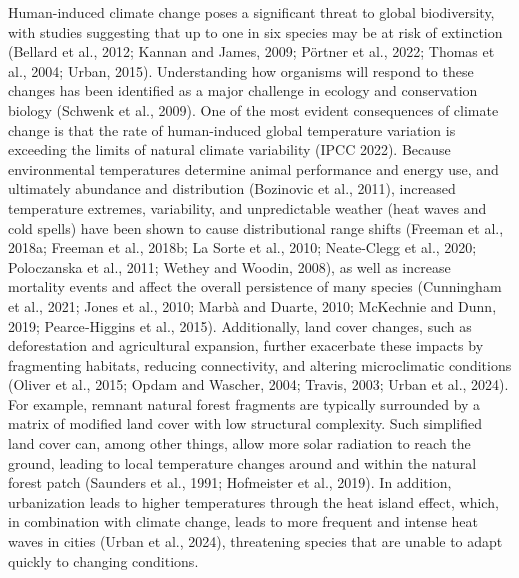 \documentclass[10pt, twoside]{book} %
\begin{document}
	Human-induced climate change poses a significant threat to global biodiversity, with studies suggesting that up to one in six species may be at risk of extinction (Bellard et al., 2012; Kannan and James, 2009; Pörtner et al., 2022; Thomas et al., 2004; Urban, 2015). Understanding how organisms will respond to these changes has been identified as a major challenge in ecology and conservation biology (Schwenk et al., 2009). One of the most evident consequences of climate change is that the rate of human-induced global temperature variation is exceeding the limits of natural climate variability (IPCC 2022). Because environmental temperatures determine animal performance and energy use, and ultimately abundance and distribution (Bozinovic et al., 2011), increased temperature extremes, variability, and unpredictable weather (heat waves and cold spells) have been shown to cause distributional range shifts (Freeman et al., 2018a; Freeman et al., 2018b; La Sorte et al., 2010; Neate-Clegg et al., 2020; Poloczanska et al., 2011; Wethey and Woodin, 2008), as well as increase mortality events and affect the overall persistence of many species (Cunningham et al., 2021; Jones et al., 2010; Marbà and Duarte, 2010; McKechnie and Dunn, 2019; Pearce‐Higgins et al., 2015). Additionally, land cover changes, such as deforestation and agricultural expansion, further exacerbate these impacts by fragmenting habitats, reducing connectivity, and altering microclimatic conditions (Oliver et al., 2015; Opdam and Wascher, 2004; Travis, 2003; Urban et al., 2024). For example, remnant natural forest fragments are typically surrounded by a matrix of modified land cover with low structural complexity. Such simplified land cover can, among other things, allow more solar radiation to reach the ground, leading to local temperature changes around and within the natural forest patch (Saunders et al., 1991; Hofmeister et al., 2019). In addition, urbanization leads to higher temperatures through the heat island effect, which, in combination with climate change, leads to more frequent and intense heat waves in cities (Urban et al., 2024), threatening species that are unable to adapt quickly to changing conditions.\\
\end{document}
